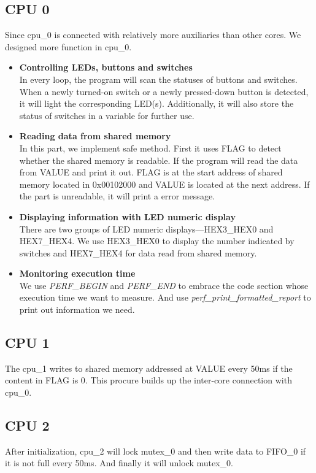 \documentclass[conference]{IEEEtran}
\begin{document}
\subsection{CPU 0}
Since cpu\_0 is connected with relatively more auxiliaries than other cores. We designed more function in cpu\_0.
\begin{itemize}
	\item{\textbf{Controlling LEDs, buttons and switches}}\\
	In every loop, the program will scan the statuses of buttons and switches. When a newly turned-on switch or a newly pressed-down button is detected, it will light the corresponding LED(s). Additionally, it will also store the status of switches in a variable for further use.
	\item{\textbf{Reading data from shared memory}}\\
	In this part, we implement safe method. First it uses FLAG to detect whether the shared memory is readable. If the program will read the data from VALUE and print it out. FLAG is at the start address of shared memory located in 0x00102000 and VALUE is located at the next address. If the part is unreadable, it will print a error message.
	\item{\textbf{Displaying information with LED numeric display}}\\
	There are two groups of LED numeric displays---HEX3\_HEX0 and HEX7\_HEX4. We use HEX3\_HEX0 to display the number indicated by switches and HEX7\_HEX4 for data read from shared memory.
	\item{\textbf{Monitoring execution time}}\\
	We use \emph{PERF\_BEGIN} and \emph{PERF\_END} to embrace the code section whose execution time we want to measure. And use \emph{perf\_print\_formatted\_report} to print out information we need.
\end{itemize}
\subsection{CPU 1}
The cpu\_1 writes to shared memory addressed at VALUE every 50ms if the content in FLAG is 0. This procure builds up the inter-core connection with cpu\_0.
\subsection{CPU 2}
After initialization, cpu\_2 will lock mutex\_0 and then write data to FIFO\_0 if it is not full every 50ms. And finally it will unlock mutex\_0.
\end{document}
